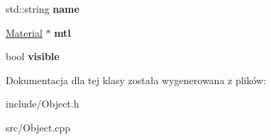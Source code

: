 \begin{DoxyCompactItemize}
\item 
\hypertarget{class_swift_1_1_object_abb53e36006fdbdd3650781663e79a46c}{std\-::string {\bfseries name}}\label{class_swift_1_1_object_abb53e36006fdbdd3650781663e79a46c}

\item 
\hypertarget{class_swift_1_1_object_ae9ad394a8ecaf399d781fa677a091f9b}{\hyperlink{class_swift_1_1_material}{Material} $\ast$ {\bfseries mtl}}\label{class_swift_1_1_object_ae9ad394a8ecaf399d781fa677a091f9b}

\item 
\hypertarget{class_swift_1_1_object_a378504148dfbad4d67a25d682d83702b}{bool {\bfseries visible}}\label{class_swift_1_1_object_a378504148dfbad4d67a25d682d83702b}

\end{DoxyCompactItemize}


Dokumentacja dla tej klasy została wygenerowana z plików\-:\begin{DoxyCompactItemize}
\item 
include/Object.\-h\item 
src/Object.\-cpp\end{DoxyCompactItemize}
